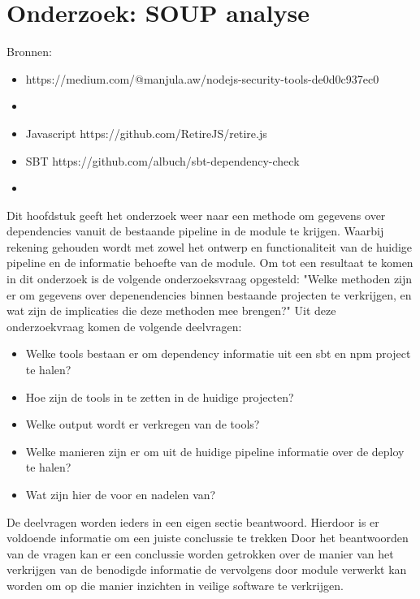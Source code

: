 \chapter{Onderzoek: SOUP analyse}\label{ch:onderzoek:-soup-analyse} %
Bronnen:

\begin{itemize}
    \item https://medium.com/@manjula.aw/nodejs-security-tools-de0d0c937ec0
    \item
\end{itemize}
\begin{itemize}
    \item Javascript     https://github.com/RetireJS/retire.js
    \item SBT https://github.com/albuch/sbt-dependency-check
    \item
\end{itemize}
Dit hoofdstuk geeft het onderzoek weer naar een methode om gegevens over dependencies vanuit de bestaande pipeline in de module te krijgen. Waarbij rekening gehouden wordt met zowel het ontwerp en functionaliteit van de huidige pipeline en de informatie behoefte van de module. Om tot een resultaat te komen in dit onderzoek is de volgende onderzoeksvraag opgesteld: "Welke methoden zijn er om gegevens over depenendencies binnen bestaande projecten te verkrijgen, en wat zijn de implicaties die deze methoden mee brengen?" Uit deze onderzoekvraag komen de volgende deelvragen:
\begin{itemize}
    \item Welke tools bestaan er om dependency informatie uit een sbt en npm project te halen?
    \item Hoe zijn de tools in te zetten in de huidige projecten?
    \item Welke output wordt er verkregen van de tools?
    \item Welke manieren zijn er om uit de huidige pipeline informatie over de deploy te halen?
    \item Wat zijn hier de voor en nadelen van?
\end{itemize}
De deelvragen worden ieders in een eigen sectie beantwoord. Hierdoor is er voldoende informatie om een juiste conclussie te trekken
Door het beantwoorden van de vragen kan er een conclussie worden getrokken over de manier van het verkrijgen van de benodigde informatie de vervolgens door module verwerkt kan worden om op die manier inzichten in veilige software te verkrijgen.



